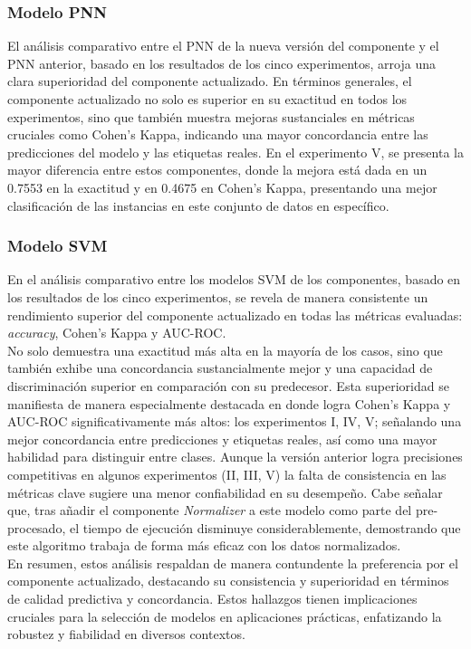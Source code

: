 \subsubsection*{Modelo PNN}
El análisis comparativo entre el PNN de la nueva versión del componente y el PNN anterior, basado en los resultados de los cinco experimentos, arroja una clara superioridad del componente actualizado. En términos generales, el componente actualizado no solo es superior en su exactitud en todos los experimentos, sino que también muestra mejoras sustanciales en métricas cruciales como Cohen’s Kappa, indicando una mayor concordancia entre las predicciones del modelo y las etiquetas reales. En el experimento V, se presenta la mayor diferencia entre estos componentes, donde la mejora está dada en un 0.7553 en la exactitud y en 0.4675 en Cohen’s Kappa, presentando una mejor clasificación de las instancias en este conjunto de datos en específico.


\subsubsection*{Modelo SVM}
En el análisis comparativo entre los modelos SVM de los componentes, basado en los resultados de los cinco experimentos, se revela de manera consistente un rendimiento superior del componente actualizado en todas las métricas evaluadas: \textit{accuracy}, Cohen's Kappa y AUC-ROC. \\
No solo demuestra una exactitud más alta en la mayoría de los casos, sino que también exhibe una concordancia sustancialmente mejor y una capacidad de discriminación superior en comparación con su predecesor. Esta superioridad se manifiesta de manera especialmente destacada en donde logra Cohen's Kappa y AUC-ROC significativamente más altos: los experimentos I, IV, V; señalando una mejor concordancia entre predicciones y etiquetas reales, así como una mayor habilidad para distinguir entre clases. Aunque la versión anterior logra precisiones competitivas en algunos experimentos (II, III, V) la falta de consistencia en las métricas clave sugiere una menor confiabilidad en su desempeño. Cabe señalar que, tras añadir el componente \textit{Normalizer} a este modelo como parte del pre-procesado, el tiempo de ejecución disminuye considerablemente, demostrando que este algoritmo trabaja de forma más eficaz con los datos normalizados. \\
En resumen, estos análisis respaldan de manera contundente la preferencia por el componente actualizado, destacando su consistencia y superioridad en términos de calidad predictiva y concordancia. Estos hallazgos tienen implicaciones cruciales para la selección de modelos en aplicaciones prácticas, enfatizando la robustez y fiabilidad en diversos contextos.

